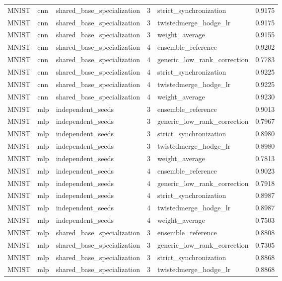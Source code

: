 \begin{table}[t]
\begin{tabular}{llllll}
MNIST & cnn & shared\_base\_specialization & 3 & strict\_synchronization & 0.9175 \\
MNIST & cnn & shared\_base\_specialization & 3 & twistedmerge\_hodge\_lr & 0.9175 \\
MNIST & cnn & shared\_base\_specialization & 3 & weight\_average & 0.9155 \\
MNIST & cnn & shared\_base\_specialization & 4 & ensemble\_reference & 0.9202 \\
MNIST & cnn & shared\_base\_specialization & 4 & generic\_low\_rank\_correction & 0.7783 \\
MNIST & cnn & shared\_base\_specialization & 4 & strict\_synchronization & 0.9225 \\
MNIST & cnn & shared\_base\_specialization & 4 & twistedmerge\_hodge\_lr & 0.9225 \\
MNIST & cnn & shared\_base\_specialization & 4 & weight\_average & 0.9230 \\
MNIST & mlp & independent\_seeds & 3 & ensemble\_reference & 0.9013 \\
MNIST & mlp & independent\_seeds & 3 & generic\_low\_rank\_correction & 0.7967 \\
MNIST & mlp & independent\_seeds & 3 & strict\_synchronization & 0.8980 \\
MNIST & mlp & independent\_seeds & 3 & twistedmerge\_hodge\_lr & 0.8980 \\
MNIST & mlp & independent\_seeds & 3 & weight\_average & 0.7813 \\
MNIST & mlp & independent\_seeds & 4 & ensemble\_reference & 0.9023 \\
MNIST & mlp & independent\_seeds & 4 & generic\_low\_rank\_correction & 0.7918 \\
MNIST & mlp & independent\_seeds & 4 & strict\_synchronization & 0.8987 \\
MNIST & mlp & independent\_seeds & 4 & twistedmerge\_hodge\_lr & 0.8987 \\
MNIST & mlp & independent\_seeds & 4 & weight\_average & 0.7503 \\
MNIST & mlp & shared\_base\_specialization & 3 & ensemble\_reference & 0.8808 \\
MNIST & mlp & shared\_base\_specialization & 3 & generic\_low\_rank\_correction & 0.7305 \\
MNIST & mlp & shared\_base\_specialization & 3 & strict\_synchronization & 0.8868 \\
MNIST & mlp & shared\_base\_specialization & 3 & twistedmerge\_hodge\_lr & 0.8868 \\

\end{tabular}
\end{table}
